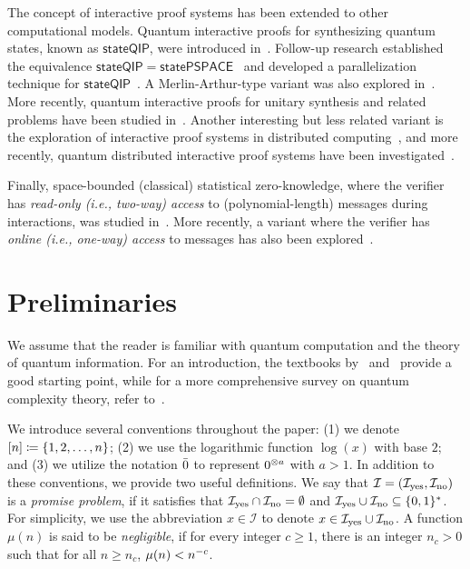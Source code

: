 \documentclass[10pt,a4paper]{article}
\numberwithin{equation}{section}
\numberwithin{figure}{section}
\DeclarePairedDelimiter\rbra{\lparen}{\rparen}
\DeclarePairedDelimiter\sbra{\lbrack}{\rbrack}
\DeclarePairedDelimiter\cbra{\{}{\}}
\let\ket\relax\DeclarePairedDelimiter\ket{\lvert}{\rangle}
\newcommand{\yes}{{\rm yes}}
\newcommand{\no}{{\rm no}}
\newcommand{\binset}{\{0,1\}}
\newcommand{\calI}{\mathcal{I}}
\begin{document}
The concept of interactive proof systems has been extended to other computational models. Quantum interactive proofs for synthesizing quantum states, known as $\mathsf{stateQIP}$, were introduced in~\cite{RY22}. Follow-up research established the equivalence $\mathsf{stateQIP} = \mathsf{statePSPACE}$~\cite{MY23} and developed a parallelization technique for $\mathsf{stateQIP}$~\cite{INNSY22,Rosenthal23}. A Merlin-Arthur-type variant was also explored in~\cite{DLGLM23,DLG24}. More recently, quantum interactive proofs for unitary synthesis and related problems have been studied in~\cite{BEMPQY23,LMW24}.
Another interesting but less related variant is the exploration of interactive proof systems in distributed computing~\cite{KOS18,NPY20}, and more recently, quantum distributed interactive proof systems have been investigated~\cite{FPLGN21,LGMN23,HKN24}.

Finally, space-bounded (classical) statistical zero-knowledge, where the verifier has \textit{read-only (i.e., two-way) access} to (polynomial-length) messages during interactions, was studied in~\cite{DGRV11,AHT23,AGMTW22}. More recently, a variant where the verifier has \textit{online (i.e., one-way) access} to messages has also been explored~\cite{CDGH23}. 

\section{Preliminaries}

We assume that the reader is familiar with quantum computation and the theory of quantum information. For an introduction, the textbooks by~\cite{NC10} and~\cite{deWolf19} provide a good starting point, while for a more comprehensive survey on quantum complexity theory, refer to~\cite{Watrous08}. 

We introduce several conventions throughout the paper: (1) we denote $\sbra{n} \coloneqq \cbra{1, 2, \dots, n}$; (2) we use the logarithmic function $\log(x)$ with base $2$; and (3) we utilize the notation $\ket{\bar{0}}$ to represent $\ket{0}^{\otimes a}$ with $a>1$.
In addition to these conventions, we provide two useful definitions. 
We say that $\calI = (\calI_{\yes}, \calI_{\no})$ is a \textit{promise problem}, if it satisfies that $\calI_{\yes} \cap \calI_{\no} =\emptyset$ and $\calI_{\yes} \cup \calI_{\no} \subseteq \binset^*$. For simplicity, we use the abbreviation $x\in\calI$ to denote $x\in \calI_{\yes} \cup \calI_{\no}$.
A function $\mu(n)$ is said to be \textit{negligible}, if for every integer $c \geq 1$, there is an integer $n_c > 0$ such that for all $n \geq n_c$, $\mu\rbra{n} < n^{-c}$. 
\end{document}
